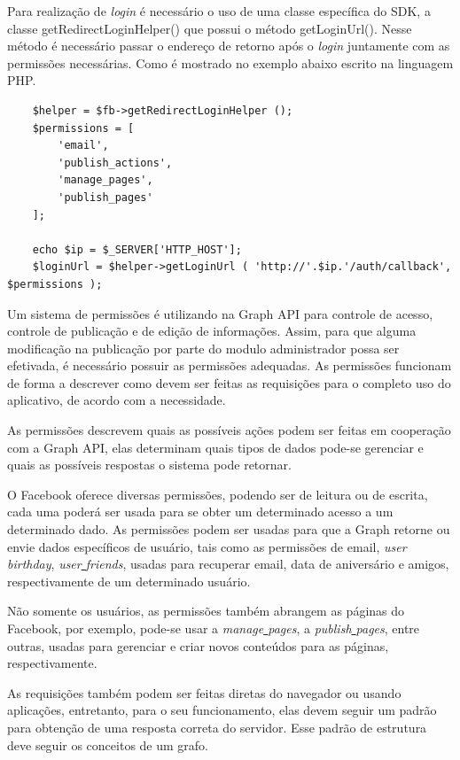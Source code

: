 Para realização de \textit{login} é necessário o uso de uma classe específica do SDK, a classe getRedirectLoginHelper() que possui o método getLoginUrl(). Nesse método é necessário passar o endereço de retorno após o \textit{login} juntamente com as permissões necessárias. Como é mostrado no exemplo abaixo escrito na linguagem PHP. 

\begin{lstlisting}
	$helper = $fb->getRedirectLoginHelper ();
	$permissions = [
		'email',
		'publish_actions',
		'manage_pages',
		'publish_pages'
	];

	echo $ip = $_SERVER['HTTP_HOST'];
	$loginUrl = $helper->getLoginUrl ( 'http://'.$ip.'/auth/callback', $permissions );
\end{lstlisting}


Um sistema de permissões é utilizando na Graph API para controle de acesso, controle de publicação e de edição de informações. Assim, para que alguma modificação na publicação por parte do modulo administrador possa ser efetivada, é necessário possuir as permissões adequadas. As permissões funcionam de forma a descrever como devem ser feitas as requisições para o completo uso do aplicativo, de acordo com a necessidade.

As permissões descrevem quais as possíveis ações podem ser feitas em cooperação com a Graph API, elas determinam quais tipos de dados pode-se gerenciar e quais as possíveis respostas o sistema pode retornar.

O Facebook oferece diversas permissões, podendo ser de leitura ou de escrita, cada uma poderá ser usada para se obter um determinado acesso a um determinado dado. As permissões podem ser usadas para que a Graph retorne ou envie dados específicos de usuário, tais como as permissões de email, \textit{user\underline{{ }}birthday}, \textit{user\underline{{ }}friends}, usadas para recuperar email, data de aniversário e amigos, respectivamente de um determinado usuário.

Não somente os usuários, as permissões também abrangem as páginas do Facebook, por exemplo, pode-se usar a \textit{manage\underline{{ }}pages}, a \textit{publish\underline{{ }}pages}, entre outras, usadas para gerenciar e criar novos conteúdos para as páginas, respectivamente.


As requisições também podem ser feitas diretas do navegador ou usando aplicações, entretanto, para o seu funcionamento, elas devem seguir um padrão para obtenção de uma resposta correta do servidor. Esse padrão de estrutura deve seguir os conceitos de um grafo.

